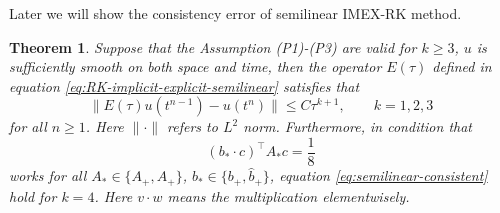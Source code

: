 \documentclass[a4paper, oneside]{book}
\def\hatA{{\hat{A}}}
\def\hatb{{\hat{b}}}
\def\As{{A_+}}
\def\Ahs{{\hatA_+}}
\def\bs{{b_+}}
\def\bhs{{\hatb_+}}
\newtheorem{theorem}{Theorem}[section]
\begin{document}
Later we will show the consistency error of semilinear IMEX-RK method. 


\begin{theorem}\label{thm:consist-nonlinear}
    Suppose that the Assumption (P1)-(P3) are valid for $k \geq 3$, 
    $u$ is sufficiently smooth on both space and time, then  
    the operator $E(\tau)$ defined in equation \eqref{eq:RK-implicit-explicit-semilinear} 
    satisfies that 
    \begin{equation}\label{eq:semilinear-consistent}
        \|E(\tau) u(t^{n-1}) - u(t^{n})\| \leq C\tau^{k+1}, \qquad k = 1, 2, 3
    \end{equation}
    for all $n \geq 1$. Here $\|\cdot\|$ refers to $L^2$ norm.
    Furthermore, 
    in condition that 
    $$(b_* \cdot c)^\top A_* c = \frac18$$  
    works for all $A_* \in \{\As, \Ahs\}$, 
    $b_* \in \{\bs, \bhs\}$, 
 equation \eqref{eq:semilinear-consistent} hold for $k=4$. 
 Here $ v\cdot w$ means the multiplication elementwisely. 
\end{theorem}
\end{document}
